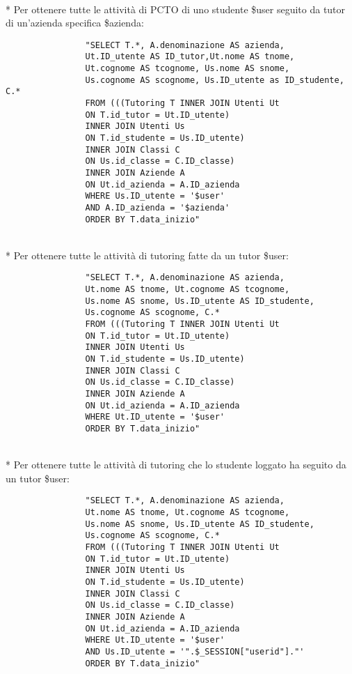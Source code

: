\documentclass[12pt]{article}
\begin{document}
\\*
\noindent
Per ottenere tutte le attività di PCTO di uno studente \$user seguito da tutor di un'azienda specifica \$azienda:
\begin{verbatim}
                "SELECT T.*, A.denominazione AS azienda, 
                Ut.ID_utente AS ID_tutor,Ut.nome AS tnome, 
                Ut.cognome AS tcognome, Us.nome AS snome, 
                Us.cognome AS scognome, Us.ID_utente as ID_studente, C.*
                FROM (((Tutoring T INNER JOIN Utenti Ut 
                ON T.id_tutor = Ut.ID_utente)
                INNER JOIN Utenti Us 
                ON T.id_studente = Us.ID_utente)
                INNER JOIN Classi C
                ON Us.id_classe = C.ID_classe)
                INNER JOIN Aziende A
                ON Ut.id_azienda = A.ID_azienda
                WHERE Us.ID_utente = '$user'
                AND A.ID_azienda = '$azienda'
                ORDER BY T.data_inizio"
\end{verbatim}

\\*
\noindent
\newpage
Per ottenere tutte le attività di tutoring fatte da un tutor \$user:
\begin{verbatim}
                "SELECT T.*, A.denominazione AS azienda, 
                Ut.nome AS tnome, Ut.cognome AS tcognome,
                Us.nome AS snome, Us.ID_utente AS ID_studente,
                Us.cognome AS scognome, C.*
                FROM (((Tutoring T INNER JOIN Utenti Ut 
                ON T.id_tutor = Ut.ID_utente)
                INNER JOIN Utenti Us 
                ON T.id_studente = Us.ID_utente)
                INNER JOIN Classi C
                ON Us.id_classe = C.ID_classe)
                INNER JOIN Aziende A
                ON Ut.id_azienda = A.ID_azienda
                WHERE Ut.ID_utente = '$user'
                ORDER BY T.data_inizio"
\end{verbatim}
\\*
\noindent
Per ottenere tutte le attività di tutoring che lo studente loggato ha seguito da un tutor \$user:
\begin{verbatim}
                "SELECT T.*, A.denominazione AS azienda, 
                Ut.nome AS tnome, Ut.cognome AS tcognome,
                Us.nome AS snome, Us.ID_utente AS ID_studente, 
                Us.cognome AS scognome, C.*
                FROM (((Tutoring T INNER JOIN Utenti Ut 
                ON T.id_tutor = Ut.ID_utente)
                INNER JOIN Utenti Us 
                ON T.id_studente = Us.ID_utente)
                INNER JOIN Classi C
                ON Us.id_classe = C.ID_classe)
                INNER JOIN Aziende A
                ON Ut.id_azienda = A.ID_azienda
                WHERE Ut.ID_utente = '$user'
                AND Us.ID_utente = '".$_SESSION["userid"]."'
                ORDER BY T.data_inizio"
\end{verbatim}
\end{document}
